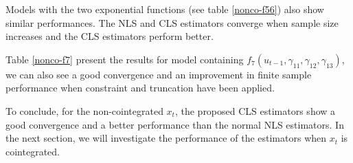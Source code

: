 \documentclass[a4paper,12pt,times,numbered,print,index]{report}
\numberwithin{equation}{section}
\begin{document}
Models with the two exponential functions (see table \ref{nonco-f56}) also show similar performances. The NLS and CLS estimators converge when sample size increases and the CLS estimators perform better.

Table \ref{nonco-f7} present the results for model containing $f_7 (u_{t-1}, \gamma_{11}, \gamma_{12}, \gamma_{13})$, we can also see a good convergence and an improvement in finite sample performance when constraint and truncation have been applied. 

To conclude, for the non-cointegrated $x_t$, the proposed CLS estimators show a good convergence and a better performance than the normal NLS estimators. In the next section, we will investigate the performance of the estimators when $x_t$ is cointegrated.

\end{document}
